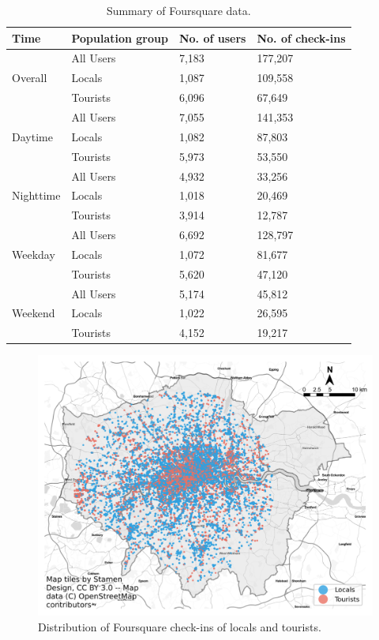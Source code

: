 \documentclass{article}
\begin{document}
\begin{table}[h!]
\centering
\caption{\label{tab:foursquare_summary}Summary of Foursquare data.}
\begin{tabular}{llll} \hline
Time & Population group & No. of users & No. of check-ins \\
\hline
\multirow{3}{*}{Overall} 
& All Users & 7,183 & 177,207 \\
& Locals & 1,087 & 109,558 \\
& Tourists & 6,096 & 67,649 \\
\hline
\multirow{3}{*}{Daytime} 
& All Users & 7,055 & 141,353 \\
& Locals & 1,082 & 87,803 \\
& Tourists & 5,973 & 53,550 \\
\hline
\multirow{3}{*}{Nighttime} 
& All Users & 4,932 & 33,256 \\
& Locals & 1,018 & 20,469 \\
& Tourists & 3,914 & 12,787 \\
\hline
\multirow{3}{*}{Weekday} 
& All Users & 6,692 & 128,797 \\
& Locals & 1,072 & 81,677 \\
& Tourists & 5,620 & 47,120 \\
\hline
\multirow{3}{*}{Weekend} 
& All Users & 5,174 & 45,812 \\
& Locals & 1,022 & 26,595 \\
& Tourists & 4,152 & 19,217 \\
\hline
\end{tabular}
\end{table}


\begin{figure}[h!]
\centering
\includegraphics[width=1\textwidth]{figures/foursquare_distribution.png}
\caption{\label{fig:foursquare_distribution}Distribution of Foursquare check-ins of locals and tourists.}
\end{figure}
\end{document}
